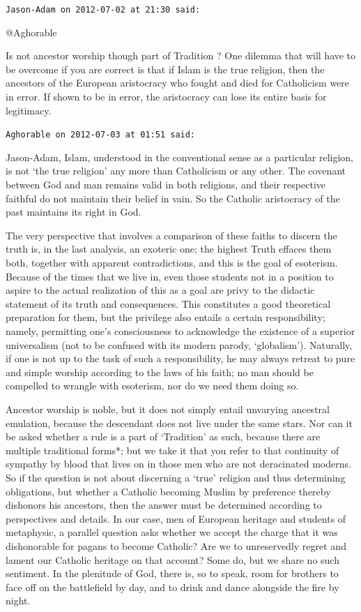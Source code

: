 \begin{footnotesize}
\begin{sffamily}
\hfill

\texttt{Jason-Adam on 2012-07-02 at 21:30 said:}

@Aghorable

Is not ancestor worship though part of Tradition ? One dilemma that will have to be overcome if you are correct is that if Islam is the true religion, then the ancestors of the European aristocracy who fought and died for Catholicism were in error. If shown to be in error, the aristocracy can lose its entire basis for legitimacy.

\hfill

\texttt{Aghorable on 2012-07-03 at 01:51 said:}

Jason-Adam, Islam, understood in the conventional sense as a particular religion, is not `the true religion' any more than Catholicism or any other. The covenant between God and man remains valid in both religions, and their respective faithful do not maintain their belief in vain. So the Catholic aristocracy of the past maintains its right in God.

The very perspective that involves a comparison of these faiths to discern the truth is, in the last analysis, an exoteric one; the highest Truth effaces them both, together with apparent contradictions, and this is the goal of esoterism. Because of the times that we live in, even those students not in a position to aspire to the actual realization of this as a goal are privy to the didactic statement of its truth and consequences. This constitutes a good theoretical preparation for them, but the privilege also entails a certain responsibility; namely, permitting one's consciousness to acknowledge the existence of a superior universalism (not to be confused with its modern parody, `globalism'). Naturally, if one is not up to the task of such a responsibility, he may always retreat to pure and simple worship according to the laws of his faith; no man should be compelled to wrangle with esoterism, nor do we need them doing so.

Ancestor worship is noble, but it does not simply entail unvarying ancestral emulation, because the descendant does not live under the same stars. Nor can it be asked whether a rule is a part of `Tradition' as such, because there are multiple traditional forms*; but we take it that you refer to that continuity of sympathy by blood that lives on in those men who are not deracinated moderns. So if the question is not about discerning a `true' religion and thus determining obligations, but whether a Catholic becoming Muslim by preference thereby dishonors his ancestors, then the answer must be determined according to perspectives and details. In our case, men of European heritage and students of metaphysic, a parallel question asks whether we accept the charge that it was dishonorable for pagans to become Catholic? Are we to unreservedly regret and lament our Catholic heritage on that account? Some do, but we share no such sentiment. In the plenitude of God, there is, so to speak, room for brothers to face off on the battlefield by day, and to drink and dance alongside the fire by night.


\end{sffamily}
\end{footnotesize}

